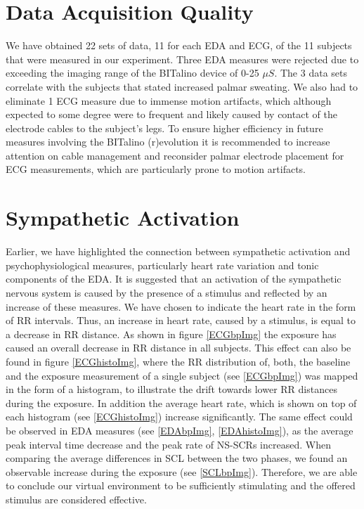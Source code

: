 
\section{Data Acquisition Quality}
We have obtained 22 sets of data, 11 for each EDA and ECG, of the 11 subjects that were measured in our experiment. Three EDA measures were rejected due to exceeding the imaging range of the BITalino device of 0-25 $\mu S$. The 3 data sets correlate with the subjects that stated increased palmar sweating. We also had to eliminate 1 ECG measure due to immense motion artifacts, which although expected to some degree were to frequent and likely caused by contact of the electrode cables to the subject's legs. To ensure higher efficiency in future measures involving the BITalino (r)evolution it is recommended to increase attention on cable management and reconsider palmar electrode placement for ECG measurements, which are particularly prone to motion artifacts.

\section{Sympathetic Activation}
Earlier, we have highlighted the connection between sympathetic activation and psychophysiological measures, particularly heart rate variation and tonic components of the EDA. It is suggested that an activation of the sympathetic nervous system is caused by the presence of a stimulus and reflected by an increase of these measures. We have chosen to indicate the heart rate in the form of RR intervals. Thus, an increase in heart rate, caused by a stimulus, is equal to a decrease in RR distance. As shown in figure \ref{ECGbpImg} the exposure has caused an overall decrease in RR distance in all subjects. This effect can also be found in figure \ref{ECGhistoImg}, where the RR distribution of, both, the baseline and the exposure measurement of a single subject (see \ref{ECGbpImg}) was mapped in the form of a histogram, to illustrate the drift towards lower RR distances during the exposure. In addition the average heart rate, which is shown on top of each histogram (see \ref{ECGhistoImg}) increase significantly.
The same effect could be observed in EDA measures (see \ref{EDAbpImg}, \ref{EDAhistoImg}), as the average peak interval time decrease and the peak rate of NS-SCRs increased. When comparing the average differences in SCL between the two phases, we found an observable increase during the exposure (see \ref{SCLbpImg}). Therefore, we are able to conclude our virtual environment to be sufficiently stimulating and the offered stimulus are considered effective. 

